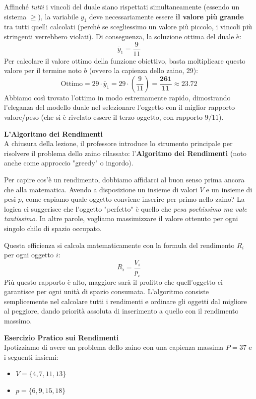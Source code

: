 \documentclass[12pt, a4paper]{article}
\begin{document}
	Affinché \textit{tutti} i vincoli del duale siano rispettati simultaneamente (essendo un sistema $\geq$), la variabile $y_1$ deve necessariamente essere \textbf{il valore più grande} tra tutti quelli calcolati (perché se scegliessimo un valore più piccolo, i vincoli più stringenti verrebbero violati).
	Di conseguenza, la soluzione ottima del duale è:
	\[
	\bar{y}_1 = \frac{9}{11}
	\]
	Per calcolare il valore ottimo della funzione obiettivo, basta moltiplicare questo valore per il termine noto $b$ (ovvero la capienza dello zaino, 29):
	\[
	\text{Ottimo} = 29 \cdot \bar{y}_1 = 29 \cdot \left(\frac{9}{11}\right) = \mathbf{\frac{261}{11}} \approx 23.72
	\]
	Abbiamo così trovato l'ottimo in modo estremamente rapido, dimostrando l'eleganza del modello duale nel selezionare l'oggetto con il miglior rapporto valore/peso (che si è rivelato essere il terzo oggetto, con rapporto $9/11$).
	
	\vspace{0.6cm}
	\textbf{L'Algoritmo dei Rendimenti}\\
	A chiusura della lezione, il professore introduce lo strumento principale per risolvere il problema dello zaino rilassato: l'\textbf{Algoritmo dei Rendimenti} (noto anche come approccio "greedy" o ingordo). 
	
	Per capire cos'è un rendimento, dobbiamo affidarci al buon senso prima ancora che alla matematica. Avendo a disposizione un insieme di valori $V$ e un insieme di pesi $p$, come capiamo quale oggetto conviene inserire per primo nello zaino? 
	La logica ci suggerisce che l'oggetto "perfetto" è quello che \textit{pesa pochissimo ma vale tantissimo}. In altre parole, vogliamo massimizzare il valore ottenuto per ogni singolo chilo di spazio occupato. 
	
	Questa efficienza si calcola matematicamente con la formula del rendimento $R_i$ per ogni oggetto $i$:
	\[
	R_i = \frac{V_i}{p_i}
	\]
	Più questo rapporto è alto, maggiore sarà il profitto che quell'oggetto ci garantisce per ogni unità di spazio consumata. L'algoritmo consiste semplicemente nel calcolare tutti i rendimenti e ordinare gli oggetti dal migliore al peggiore, dando priorità assoluta di inserimento a quello con il rendimento massimo.
	
	\vspace{0.4cm}
	\textbf{Esercizio Pratico sui Rendimenti}\\
	Ipotizziamo di avere un problema dello zaino con una capienza massima $P = 37$ e i seguenti insiemi:
	\begin{itemize}[label=\textcolor{titlecolor}{\Large\textbullet}, itemsep=2pt, leftmargin=1.5cm]
		\item $V = \{4, 7, 11, 13\}$
		\item $p = \{6, 9, 15, 18\}$
	\end{itemize}
	
\end{document}
